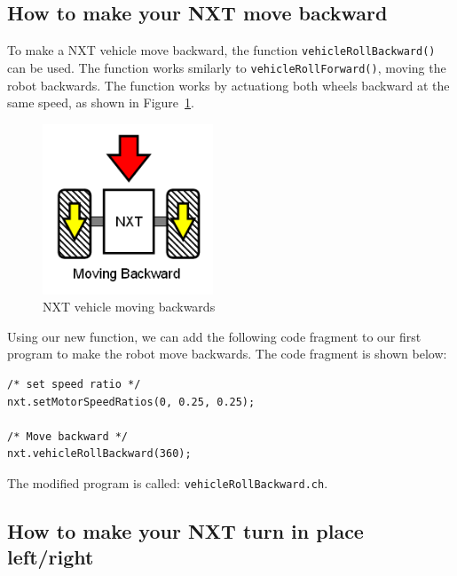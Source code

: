 \documentclass[11pt]{article}
\begin{document}
\subsection{How to make your NXT move backward}
To make a NXT vehicle move backward, the function {\tt vehicleRollBackward()} 
can be used. The function works smilarly to {\tt vehicleRollForward()}, moving 
the robot backwards. The function works by actuationg both wheels backward at 
the same speed, as shown in Figure~\ref{fig_NXT_backward}.\\
\begin{figure}[h]
  \begin{center}
    \includegraphics[height=2in]{figure/mindstorm/Vehicle_back.png}
    \caption{NXT vehicle moving backwards\label{fig_NXT_backward}}
  \end{center}
\end{figure}
Using our new function, we can add the following code fragment to our first 
program to make the robot move backwards. The code fragment is shown below:
\begin{lstlisting}
/* set speed ratio */
nxt.setMotorSpeedRatios(0, 0.25, 0.25);

/* Move backward */
nxt.vehicleRollBackward(360);
\end{lstlisting}
The modified program is called: {\tt vehicleRollBackward.ch}.

\subsection{How to make your NXT turn in place left/right}
\end{document}
